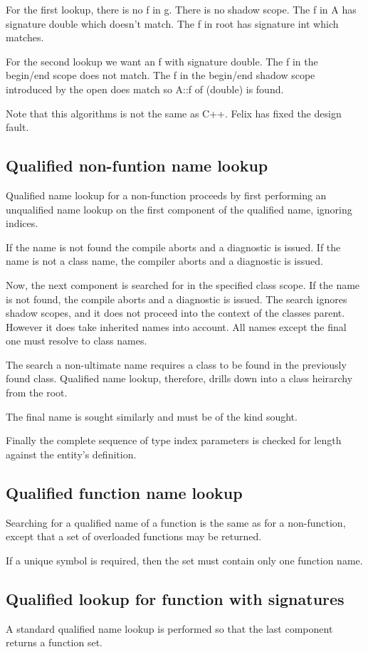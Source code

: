 \documentclass[oneside]{book}
\begin{document}
For the first lookup, there is no f in g.
There is no shadow scope.
The f in A has signature double which doesn't match.
The f in root has signature int which matches.

For the second lookup we want an f with signature double.
The f in the begin/end scope does not match.
The f in the begin/end shadow scope introduced by the open
does match so A::f of (double) is found.

Note that this algorithms is not the same as C++.
Felix has fixed the design fault.

   
\subsection{Qualified non-funtion name lookup}
Qualified name lookup for a non-function proceeds by
first performing an unqualified name lookup on the first
component of the qualified name, ignoring indices.

If the name is not found the compile aborts and a diagnostic
is issued. If the name is not a class name, the compiler aborts
and a diagnostic is issued.

Now, the next component is searched for in the
specified class scope. If the name is not found, the compile
aborts and a diagnostic is issued. The search ignores shadow
scopes, and it does not proceed into the context of the
classes parent. However it does take inherited names into account.
All names except the final one must resolve to class names.

The search a non-ultimate name requires a class to be found
in the previously found class. Qualified name lookup, therefore,
drills down into a class heirarchy from the root.

The final name is sought similarly and must be of the
kind sought.

Finally the complete sequence of type index parameters is checked
for length against the entity's definition.

\subsection{Qualified function name lookup}
Searching for a qualified name of a function is the same
as for a non-function, except that a set of overloaded
functions may be returned. 

If a unique symbol is required, then the set must contain
only one function name.

\subsection{Qualified lookup for function with signatures}
A standard qualified name lookup is performed so that the
last component returns a function set. 
\end{document}
